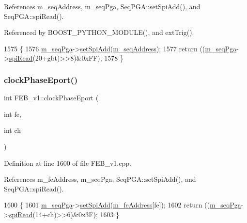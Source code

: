 References m\+\_\+seq\+Address, m\+\_\+seq\+Pga, Seq\+P\+G\+A\+::set\+Spi\+Add(), and Seq\+P\+G\+A\+::spi\+Read().



Referenced by B\+O\+O\+S\+T\+\_\+\+P\+Y\+T\+H\+O\+N\+\_\+\+M\+O\+D\+U\+L\+E(), and ext\+Trig().


\begin{DoxyCode}
1575                                    \{
1576   \hyperlink{classFEB__v1_a6c7804ac86796f233a8393043adf2e77}{m\_seqPga}->\hyperlink{classSeqPGA_ac998ce3a6d9b5f2e88cc8393f8c1df53}{setSpiAdd}(\hyperlink{classFEB__v1_a1c1eb093fd1733b9510fcf8bc5c7ad08}{m\_seqAddress});
1577   \textcolor{keywordflow}{return} ((\hyperlink{classFEB__v1_a6c7804ac86796f233a8393043adf2e77}{m\_seqPga}->\hyperlink{classSeqPGA_ab3d0e5e5d4014bc7a92588a76b8713d4}{spiRead}(20+gbt)>>8)&0xFF);
1578 \}
\end{DoxyCode}
\mbox{\label{classFEB__v1_aab32d0b274dfb55f1c2894ff3d08eaba}} 
\subsubsection{\texorpdfstring{clock\+Phase\+Eport()}{clockPhaseEport()}\hspace{0.1cm}{\footnotesize\ttfamily [2/2]}}
{\footnotesize\ttfamily int F\+E\+B\+\_\+v1\+::clock\+Phase\+Eport (\begin{DoxyParamCaption}\item[{int}]{fe,  }\item[{int}]{ch }\end{DoxyParamCaption})}



Definition at line 1600 of file F\+E\+B\+\_\+v1.\+cpp.



References m\+\_\+fe\+Address, m\+\_\+seq\+Pga, Seq\+P\+G\+A\+::set\+Spi\+Add(), and Seq\+P\+G\+A\+::spi\+Read().


\begin{DoxyCode}
1600                                           \{
1601   \hyperlink{classFEB__v1_a6c7804ac86796f233a8393043adf2e77}{m\_seqPga}->\hyperlink{classSeqPGA_ac998ce3a6d9b5f2e88cc8393f8c1df53}{setSpiAdd}(\hyperlink{classFEB__v1_a4e1945c2d5b434125f375e9d0fc6d99f}{m\_feAddress}[fe]);
1602   \textcolor{keywordflow}{return} ((\hyperlink{classFEB__v1_a6c7804ac86796f233a8393043adf2e77}{m\_seqPga}->\hyperlink{classSeqPGA_ab3d0e5e5d4014bc7a92588a76b8713d4}{spiRead}(14+ch)>>6)&0x3F);
1603 \}
\end{DoxyCode}
\mbox{\label{classElement_af57444353c1ddf9fa0109801e97debf7}} 
